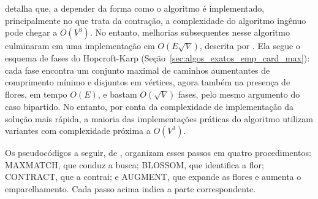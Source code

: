  detalha que, a depender da forma como o algoritmo é implementado, principalmente no que trata da contração, a complexidade do algoritmo ingênuo pode chegar a $O(V^3)$. No entanto, melhorias subsequentes nesse algoritmo culminaram em uma implementação em $O(E\sqrt{V})$, descrita por . Ela segue o esquema de fases do Hopcroft-Karp (Seção~\ref{sec:algos_exatos_emp_card_max}): cada fase encontra um conjunto maximal de caminhos aumentantes de comprimento mínimo e disjuntos em vértices, agora também na presença de flores, em tempo $O(E)$, e bastam $O(\sqrt{V})$ fases, pelo mesmo argumento do caso bipartido. No entanto, por conta da complexidade de implementação da solução mais rápida, a maioria das implementações práticas do algoritmo utilizam variantes com complexidade próxima a $O(V^3)$.

Os pseudocódigos a seguir, de , organizam esses passos em quatro procedimentos: MAXMATCH, que conduz a busca; BLOSSOM, que identifica a flor; CONTRACT, que a contrai; e AUGMENT, que expande as flores e aumenta o emparelhamento. Cada passo acima indica a parte correspondente.

